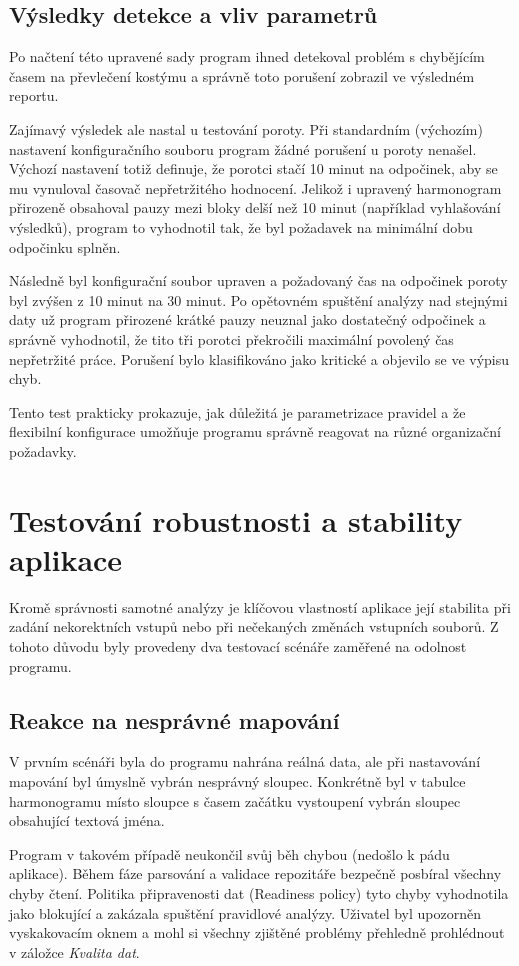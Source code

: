 \documentclass[czech, kiv, ba, he, iso690alph, pdf]{fasthesis}
\begin{document}
			\subsection{Výsledky detekce a vliv parametrů}
				Po načtení této upravené sady program ihned detekoval problém s chybějícím časem na převlečení kostýmu a správně toto porušení zobrazil ve výsledném reportu. 

				Zajímavý výsledek ale nastal u testování poroty. Při standardním (výchozím) nastavení konfiguračního souboru program žádné porušení u poroty nenašel. Výchozí nastavení totiž definuje, že porotci stačí 10 minut na odpočinek, aby se mu vynuloval časovač nepřetržitého hodnocení. Jelikož i upravený harmonogram přirozeně obsahoval pauzy mezi bloky delší než 10 minut (například vyhlašování výsledků), program to vyhodnotil tak, že byl požadavek na minimální dobu odpočinku splněn.

				Následně byl konfigurační soubor upraven a požadovaný čas na odpočinek poroty byl zvýšen z 10 minut na 30 minut. Po opětovném spuštění analýzy nad stejnými daty už program přirozené krátké pauzy neuznal jako dostatečný odpočinek a správně vyhodnotil, že tito tři porotci překročili maximální povolený čas nepřetržité práce. Porušení bylo klasifikováno jako kritické a objevilo se ve výpisu chyb.

				Tento test prakticky prokazuje, jak důležitá je parametrizace pravidel a že flexibilní konfigurace umožňuje programu správně reagovat na různé organizační požadavky.

		\section{Testování robustnosti a stability aplikace}
			Kromě správnosti samotné analýzy je klíčovou vlastností aplikace její stabilita při zadání nekorektních vstupů nebo při nečekaných změnách vstupních souborů. Z tohoto důvodu byly provedeny dva testovací scénáře zaměřené na odolnost programu.

			\subsection{Reakce na nesprávné mapování}
				V prvním scénáři byla do programu nahrána reálná data, ale při nastavování mapování byl úmyslně vybrán nesprávný sloupec. Konkrétně byl v tabulce harmonogramu místo sloupce s časem začátku vystoupení vybrán sloupec obsahující textová jména.

				Program v takovém případě neukončil svůj běh chybou (nedošlo k pádu aplikace). Během fáze parsování a validace repozitáře bezpečně posbíral všechny chyby čtení. Politika připravenosti dat (Readiness policy) tyto chyby vyhodnotila jako blokující a zakázala spuštění pravidlové analýzy. Uživatel byl upozorněn vyskakovacím oknem a mohl si všechny zjištěné problémy přehledně prohlédnout v záložce \textit{Kvalita dat}.
\end{document}
